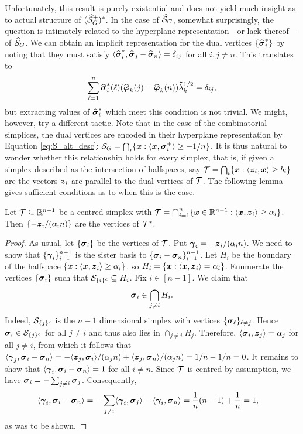 Unfortunately, this result is purely  existential and does not yield much insight as to  actual structure of $(\widehat{\mathcal{S}}_G^+)^*$. In the  case of $\widehat{\mathcal{S}}_G$, somewhat surprisingly, the question is intimately related to the hyperplane representation---or lack thereof---of $\widehat{\mathcal{S}}_G$. 
We can obtain an implicit representation for the dual vertices $\{\widehat{\vb*{\sigma}}^*_i\}$ by noting that they must satisfy  $\langle \widehat{\vb*{\sigma}}^*_i,\widehat{\vb*{\sigma}}_j-\widehat{\vb*{\sigma}}_n\rangle=\delta_{ij}$ for all $i,j\neq n$. This translates to 
\begin{equation*}
\sum_{\ell=1}^n \widehat{\vb*{\sigma}}^*_i(\ell)(\widehat{\vb*{\varphi}}_k(j)-\widehat{\vb*{\varphi}}_k(n))\widehat{\lambda}_k^{1/2}=\delta_{ij},
\end{equation*}
but extracting values of $\widehat{\vb*{\sigma}}^*_i$ which meet this condition is not trivial. 
We might, however, try a different tactic. Note that in the case of the combinatorial simplices, the dual vertices are encoded in their hyperplane representation by Equation \eqref{eq:S_alt_desc}: $\mathcal{S}_G = \bigcap_i\{\vb*{x}:\langle \vb*{x},\vb*{\sigma}_i^+\rangle \geq -1/n\}$. It is thus  natural to wonder whether this relationship holds for every simplex, that is,  if given a simplex described as the intersection of halfspaces, say $\mathcal{T}=\bigcap_i \{\vb*{x}:\langle \vb*{z}_i,\vb*{x}\rangle \geq b_i\}$ are the vectors $\vb*{z}_i$ are parallel to the dual vertices of $\mathcal{T}$.  The following lemma gives  sufficient conditions as to when this is the case. 

 
\begin{lemma}
	\label{lem:hdesc_dual}
	Let $\mathcal{T}\subseteq\mathbb{R}^{n-1}$ be a centred simplex with $\mathcal{T}=\bigcap_{i=1}^n  \{\vb*{x}\in\mathbb{R}^{n-1}: \langle \vb*{x},\vb*{z}_i\rangle \geq  \alpha_i\}$. Then $\{-\vb*{z}_i/(\alpha_i n)\}$ are the vertices of $\mathcal{T}^*$. 
\end{lemma}
\begin{proof}
	As usual, let $\{\vb*{\sigma}_i\}$ be the vertices of $\mathcal{T}$. Put $\vb*{\gamma}_i = -\vb*{z}_i/(\alpha_i n)$. We need to show that $\{\vb*{\gamma}_i\}_{i=1}^{n-1}$ is the sister basis to $\{\vb*{\sigma}_i-\vb*{\sigma}_n\}_{i=1}^{n-1}$. Let $H_i$ be the boundary of the halfspace $\{\vb*{x}:\langle \vb*{x},\vb*{z}_i\rangle \geq \alpha_i\}$, so $H_i = \{\vb*{x}:\langle \vb*{x},\vb*{z}_i\rangle = \alpha_i\}$. Enumerate the vertices $\{\vb*{\sigma}_i\}$ such that $\mathcal{S}_{\{i\}^c} \subseteq H_i$. Fix $i\in[n-1]$. We claim that 
	\[\vb*{\sigma}_i \in \bigcap_{j\neq i}H_i.\]
	Indeed, $\mathcal{S}_{\{j\}^c}$ is the $n-1$ dimensional simplex with vertices $\{\vb*{\sigma}_\ell\}_{\ell\neq j}$. Hence $\vb*{\sigma}_i\in \mathcal{S}_{\{j\}^c}$ for all $j\neq i$ and thus also lies in $\cap_{j \neq i}H_j$. Therefore, $\langle \vb*{\sigma}_i,\vb*{z}_j\rangle = \alpha_j$ for all $j\neq i$, from which it follows  that $\langle \vb*{\gamma}_j,\vb*{\sigma}_i-\vb*{\sigma}_n\rangle = -\langle \vb*{z}_j,\vb*{\sigma}_i\rangle/(\alpha_j n) + \langle \vb*{z}_j,\vb*{\sigma}_n\rangle / (\alpha_j n )=1/n - 1/n =0$.  
	It remains to show that $\langle \vb*{\gamma}_i,\vb*{\sigma}_i-\vb*{\sigma}_n\rangle=1$ for all $i\neq n$. Since $\mathcal{T}$ is centred by assumption, we have $\vb*{\sigma}_i = -\sum_{j\neq i} \vb*{\sigma}_j$. Consequently, 
	\begin{align*}
	\langle \vb*{\gamma}_i,\vb*{\sigma}_i-\vb*{\sigma}_n\rangle &= -\sum_{j\neq i}\langle \vb*{\gamma}_i,\vb*{\sigma}_j\rangle - \langle \vb*{\gamma}_i,\vb*{\sigma}_n \rangle = \frac{1}{n}(n-1) + \frac{1}{n} = 1,
	\end{align*}
	as was to be shown.  
\end{proof}

